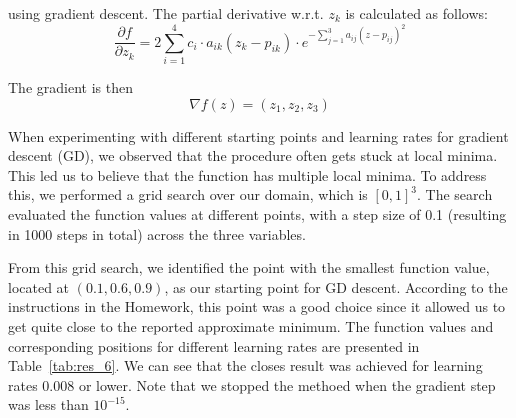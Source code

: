 \documentclass[9pt]{IEEEtran}
\begin{document}
    
    using gradient descent. The partial derivative w.r.t. $z_k$ is calculated as follows:
    \begin{equation}
        \frac{\partial f}{\partial z_k} = 2 \sum_{i=1}^{4} c_i \cdot a_{ik} (z_k - p_{ik}) \cdot e^{-\sum_{j=1}^{3} a_{ij} (z - p_{ij})^2}
    \end{equation}
    
    The gradient is then 
    \begin{equation}
        \nabla f(z) = (z_1, z_2,z_3)
    \end{equation}
         
        When experimenting with different starting points and learning rates for gradient descent (GD), we observed that the procedure often gets stuck at local minima. This led us to believe that the function has multiple local minima. To address this, we performed a grid search over our domain, which is $[0,1]^3$. The search evaluated the function values at different points, with a step size of 0.1 (resulting in 1000 steps in total) across the three variables.

        From this grid search, we identified the point with the smallest function value, 
        located at $(0.1, 0.6, 0.9)$, as our starting point for GD descent. According to 
        the instructions in the Homework, this point was a good choice since it allowed us 
        to get quite close to the reported approximate minimum. The function values and
         corresponding positions for different learning rates are presented in Table~\ref{tab:res_6}.
         We can see that the closes result was achieved for learning rates 0.008 or lower. Note that we stopped 
         the methoed when the gradient step was less than $10^{-15}$.  
\end{document}
